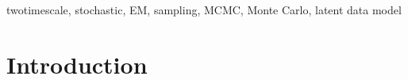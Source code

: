 \documentclass[journal, 11pt]{IEEEtran}
\begin{document}
\begin{IEEEkeywords}
twotimescale, stochastic, EM, sampling, MCMC, Monte Carlo, latent data model
\end{IEEEkeywords}






%
\IEEEpeerreviewmaketitle



\section{Introduction}
\end{document}
